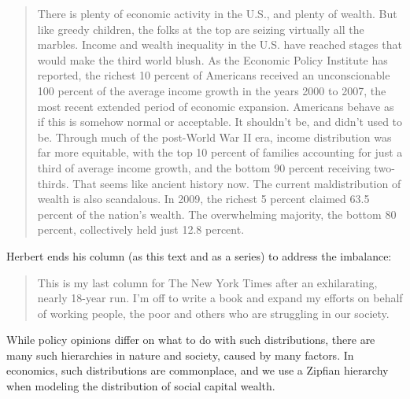 \documentclass[10pt,oneside]{memoir}
\begin{document}
\begin{Spacing}{2}
\begin{quote}
There is plenty of economic activity in the U.S., and plenty of wealth. But like greedy children, the folks at the top are seizing virtually all the marbles. Income and wealth inequality in the U.S. have reached stages that would make the third world blush. As the Economic Policy Institute has reported, the richest 10 percent of Americans received an unconscionable 100 percent of the average income growth in the years 2000 to 2007, the most recent extended period of economic expansion.
Americans behave as if this is somehow normal or acceptable. It shouldn't be, and didn't used to be. Through much of the post-World War II era, income distribution was far more equitable, with the top 10 percent of families accounting for just a third of average income growth, and the bottom 90 percent receiving two-thirds. That seems like ancient history now.
The current maldistribution of wealth is also scandalous. In 2009, the richest 5 percent claimed 63.5 percent of the nation's wealth. The overwhelming majority, the bottom 80 percent, collectively held just 12.8 percent.
\end{quote}
Herbert ends his column (as this text and as a series) to address the imbalance:
\begin{quote}
This is my last column for The New York Times after an exhilarating, nearly 18-year run. I'm off to write a book and expand my efforts on behalf of working people, the poor and others who are struggling in our society.
\end{quote}


While policy opinions differ on what to do with such distributions, there are many such hierarchies in nature and society, caused by many factors.  In economics, such distributions are commonplace, and we use a Zipfian hierarchy when modeling the distribution of social capital wealth.




\end{Spacing}
\end{document}

